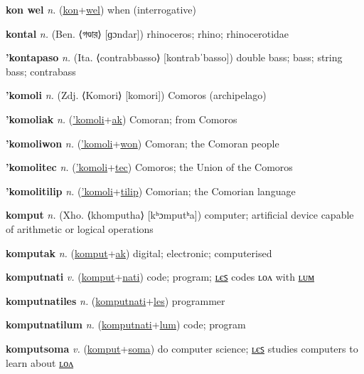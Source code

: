 \textbf{\hypertarget{kon wel}{kon wel}} \textit{n.} (\hyperlink{kon}{kon}+\allowbreak \hyperlink{wel}{wel})
when (interrogative)

\textbf{\hypertarget{kontal}{kontal}} \textit{n.} (Ben. ⟨{\bengali{}গণ্ডার}⟩ [ɡɔndar])
rhinoceros; rhino; rhinocerotidae

\textbf{\hypertarget{'kontapaso}{'kontapaso}} \textit{n.} (Ita. ⟨contrabbasso⟩ [kontrabˈbasso])
double bass; bass; string bass; contrabass

\textbf{\hypertarget{'komoli}{'komoli}} \textit{n.} (Zdj. ⟨Komori⟩ [komori])
Comoros (archipelago)

\textbf{\hypertarget{'komoliak}{'komoliak}} \textit{n.} (\hyperlink{'komoli}{'komoli}+\allowbreak \hyperlink{ak}{ak})
Comoran; from Comoros

\textbf{\hypertarget{'komoliwon}{'komoliwon}} \textit{n.} (\hyperlink{'komoli}{'komoli}+\allowbreak \hyperlink{won}{won})
Comoran; the Comoran people

\textbf{\hypertarget{'komolitec}{'komolitec}} \textit{n.} (\hyperlink{'komoli}{'komoli}+\allowbreak \hyperlink{tec}{tec})
Comoros; the Union of the Comoros

\textbf{\hypertarget{'komolitilip}{'komolitilip}} \textit{n.} (\hyperlink{'komoli}{'komoli}+\allowbreak \hyperlink{tilip}{tilip})
Comorian; the Comorian language

\textbf{\hypertarget{komput}{komput}} \textit{n.} (Xho. ⟨khomputha⟩ [kʰɔmputʰa])
computer; artificial device capable of arithmetic or logical operations

\textbf{\hypertarget{komputak}{komputak}} \textit{n.} (\hyperlink{komput}{komput}+\allowbreak \hyperlink{ak}{ak})
digital; electronic; computerised

\textbf{\hypertarget{komputnati}{komputnati}} \textit{v.} (\hyperlink{komput}{komput}+\allowbreak \hyperlink{nati}{nati})
code; program; \hyperlink{komputnatiles}{ʟєꜱ} codes ʟᴏᴧ with \hyperlink{komputnatilum}{ʟᴜᴍ}

\textbf{\hypertarget{komputnatiles}{komputnatiles}} \textit{n.} (\hyperlink{komputnati}{komputnati}+\allowbreak \hyperlink{les}{les})
programmer

\textbf{\hypertarget{komputnatilum}{komputnatilum}} \textit{n.} (\hyperlink{komputnati}{komputnati}+\allowbreak \hyperlink{lum}{lum})
code; program

\textbf{\hypertarget{komputsoma}{komputsoma}} \textit{v.} (\hyperlink{komput}{komput}+\allowbreak \hyperlink{soma}{soma})
do computer science; \hyperlink{komputsomales}{ʟєꜱ} studies computers to learn about \hyperlink{komputsomalon}{ʟᴏᴧ}

